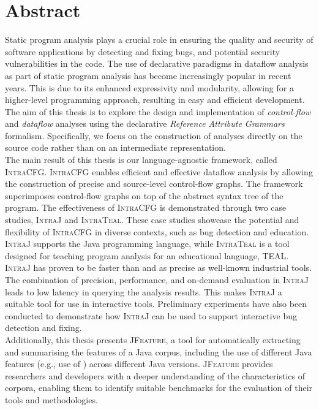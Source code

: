 \chapter{Abstract}


Static program analysis plays a crucial role in ensuring the quality and security of
software applications by detecting and fixing bugs,
and potential security vulnerabilities in the code. The use of declarative
paradigms in dataflow analysis as part of static program analysis has become
increasingly popular in recent years. This is due to its enhanced expressivity
and modularity, allowing for a higher-level programming approach, resulting in
easy and efficient development.\\[5pt]

The aim of this thesis is to explore the design and implementation of \emph{control-flow} and
\emph{dataflow} analyses using the declarative \emph{Reference Attribute Grammars} formalism.
Specifically, we focus on the construction of analyses directly on the source code
rather than on an intermediate representation.\\[5pt]

The main result of this thesis is our language-agnostic framework, called \textsc{IntraCFG}.
\textsc{IntraCFG} enables efficient and effective dataflow analysis by allowing the construction of precise and
source-level control-flow graphs. The framework superimposes control-flow
graphs on top of the abstract syntax tree of the program.
The effectiveness of \textsc{IntraCFG} is demonstrated through two case studies,
\textsc{IntraJ} and \textsc{IntraTeal}. These case studies showcase the potential and
flexibility of \textsc{IntraCFG} in diverse contexts, such as bug detection and education.
\textsc{IntraJ} supports the Java programming language, while
\textsc{IntraTeal} is a tool designed for teaching program analysis for an educational language, TEAL.\\[5pt]

\textsc{IntraJ} has proven to be faster than and as precise as well-known
industrial tools.
The combination of precision, performance, and on-demand evaluation in \textsc{IntraJ}
leads to low latency in querying the analysis results. This makes \textsc{IntraJ} a
suitable tool for use in interactive tools. Preliminary experiments have also
been conducted to demonstrate how \textsc{IntraJ} can be used to support interactive
bug detection and fixing.\\[5pt]

Additionally, this thesis presents \textsc{JFeature}, a tool for automatically extracting
and summarising the features of a Java corpus, including the use of different Java features (e.g., use of ) across different
Java versions. \textsc{JFeature} provides
researchers and developers with a deeper understanding of the characteristics of
corpora, enabling them to identify suitable benchmarks for the evaluation of their
tools and methodologies.
